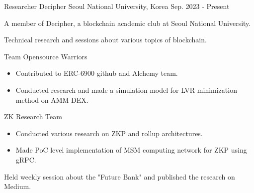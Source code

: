


\begin{cventries}


\cventry
{Researcher} %
{Decipher} %
{Seoul National University, Korea} %
{Sep. 2023 - Present} %
{ %
\begin{cvitems}
\item {A member of Decipher, a blockchain academic club at Seoul National University.}
\item {Technical research and sessions about various topics of blockchain.}
\item {Team Opensource Warriors}
\begin{itemize}
  \item {Contributed to ERC-6900 github and Alchemy team.}
  \item {Conducted research and made a simulation model for LVR minimization method on AMM DEX.}
\end{itemize}
\item {ZK Research Team}
\begin{itemize}
  \item {Conducted various research on ZKP and rollup architectures.}
  \item {Made PoC level implementation of MSM computing network for ZKP using gRPC.}
\end{itemize}
\item {Held weekly session about the "Future Bank" and published the research on Medium.}
\end{cvitems}
}



\end{cventries}
